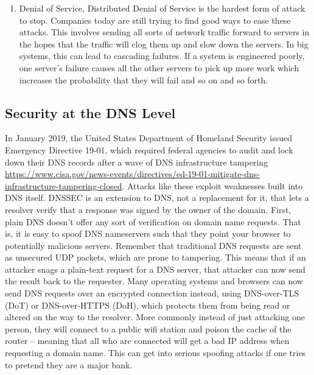 \begin{enumerate}
  The SYN flood is easily mitigated by using IPTABLES or another netfilter module to drop all incoming connections from an IP address after a certain volume of traffic is reached for a certain period.
\item Denial of Service, Distributed Denial of Service is the hardest form of attack to stop.
  Companies today are still trying to find good ways to ease these attacks.
  This involves sending all sorts of network traffic forward to servers in the hopes that the traffic will clog them up and slow down the servers.
  In big systems, this can lead to cascading failures. If a system is engineered poorly, one server's failure causes all the other servers to pick up more work which increases the probability that they will fail and so on and so forth.
\end{enumerate}

\subsection{Security at the DNS Level}

In January 2019, the United States Department of Homeland Security issued Emergency Directive 19-01, which required federal agencies to audit and lock down their DNS records after a wave of DNS infrastructure tampering \url{https://www.cisa.gov/news-events/directives/ed-19-01-mitigate-dns-infrastructure-tampering-closed}.
Attacks like these exploit weaknesses built into DNS itself.
DNSSEC is an extension to DNS, not a replacement for it, that lets a resolver verify that a response was signed by the owner of the domain.
First, plain DNS doesn't offer any sort of verification on domain name requests.
That is, it is easy to spoof DNS nameservers such that they point your browser to potentially malicious servers.
Remember that traditional DNS requests are sent as unsecured UDP packets, which are prone to tampering. This means that if an attacker snags a plain-text request for a DNS server, that attacker can now send the result back to the requester.
Many operating systems and browsers can now send DNS requests over an encrypted connection instead, using DNS-over-TLS (DoT) or DNS-over-HTTPS (DoH), which protects them from being read or altered on the way to the resolver.
More commonly instead of just attacking one person, they will connect to a public wifi station and poison the cache of the router -- meaning that all who are connected will get a bad IP address when requesting a domain name.
This can get into serious spoofing attacks if one tries to pretend they are a major bank.

